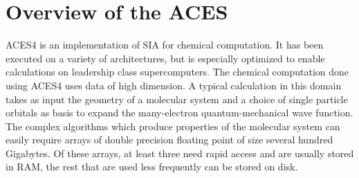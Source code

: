 \section{Overview of the ACES}
ACES4 is an implementation of SIA for chemical computation. It has been executed
on a variety of architectures, but is especially optimized to enable
calculations on leadership class supercomputers. The chemical computation done
using ACES4 uses data of high dimension. A typical calculation in this domain
takes as input the geometry of a molecular system and a choice of single
particle orbitals as basis to expand the many-electron quantum-mechanical wave
function. The complex algorithms which produce properties of the molecular
system can easily require arrays of double precision floating point of size
several hundred Gigabytes. Of these arrays, at least three need rapid access and
are usually stored in RAM, the rest that are used less frequently can be stored
on disk.